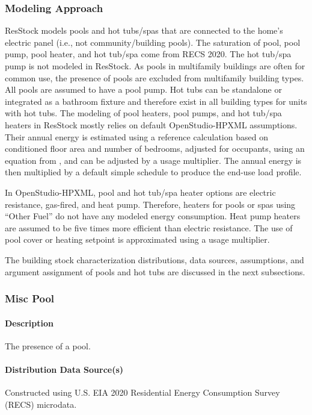 \subsubsection{Modeling Approach}
ResStock models pools and hot tubs/spas that are connected to the home's electric panel (i.e., not community/building pools). The saturation of pool, pool pump, pool heater, and hot tub/spa come from RECS 2020. The hot tub/spa pump is not modeled in ResStock. As pools in multifamily buildings are often for common use, the presence of pools are excluded from multifamily building types. All pools are assumed to have a pool pump. Hot tubs can be standalone or integrated as a bathroom fixture and therefore exist in all building types for units with hot tubs. The modeling of pool heaters, pool pumps, and hot tub/spa heaters in ResStock mostly relies on default OpenStudio-HPXML assumptions. Their annual energy is estimated using a reference calculation based on conditioned floor area and number of bedrooms, adjusted for occupants, using an equation from \citet{bahsp_2010}, and can be adjusted by a usage multiplier. The annual energy is then multiplied by a default simple schedule to produce the end-use load profile.

In OpenStudio-HPXML, pool and hot tub/spa heater options are electric resistance, gas-fired, and heat pump. Therefore, heaters for pools or spas using ``Other Fuel'' do not have any modeled energy consumption. Heat pump heaters are assumed to be five times more efficient than electric resistance. The use of pool cover or heating setpoint is approximated using a usage multiplier. 

The building stock characterization distributions, data sources, assumptions, and argument assignment of pools and hot tubs are discussed in the next subsections.

\subsubsection{Misc Pool}
\paragraph{Description}
The presence of a pool.

\paragraph{Distribution Data Source(s)}
Constructed using U.S. EIA 2020 Residential Energy Consumption Survey (RECS) microdata. 


